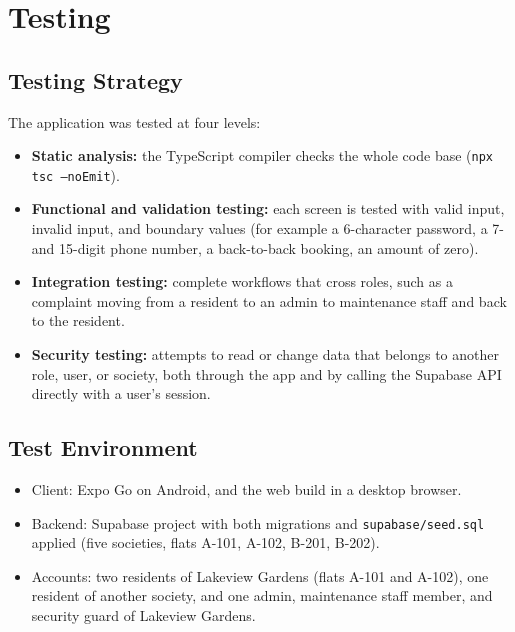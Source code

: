 \documentclass{tietreport}
\renewcommand{\_}{\textunderscore\allowbreak}
\begin{document}

\section{Testing}

\subsection{Testing Strategy}

The application was tested at four levels:

\begin{itemize}
  \item \textbf{Static analysis:} the TypeScript compiler checks the whole
  code base (\texttt{npx tsc --noEmit}).
  \item \textbf{Functional and validation testing:} each screen is tested
  with valid input, invalid input, and boundary values (for example a
  6-character password, a 7- and 15-digit phone number, a back-to-back
  booking, an amount of zero).
  \item \textbf{Integration testing:} complete workflows that cross roles,
  such as a complaint moving from a resident to an admin to maintenance staff
  and back to the resident.
  \item \textbf{Security testing:} attempts to read or change data that
  belongs to another role, user, or society, both through the app and by
  calling the Supabase API directly with a user's session.
\end{itemize}

\subsection{Test Environment}

\begin{itemize}
  \item Client: Expo Go on Android, and the web build in a desktop browser.
  \item Backend: Supabase project with both migrations and
  \texttt{supabase/seed.sql} applied (five societies, flats A-101, A-102,
  B-201, B-202).
  \item Accounts: two residents of Lakeview Gardens (flats A-101 and A-102),
  one resident of another society, and one admin, maintenance staff member,
  and security guard of Lakeview Gardens.
\end{itemize}
\end{document}
